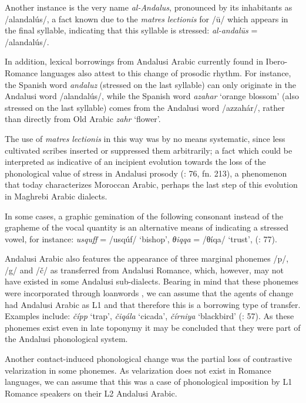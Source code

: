 \documentclass[output=paper,modfonts,nonflat]{langsci/langscibook}
\begin{document}
Another instance is the very name \textit{al-Andalus}, pronounced by its inhabitants as /alandalús/, a fact known due to the \textit{matres} \textit{lectionis} for /ū/ which appears in the final syllable, indicating that this syllable is stressed: {} \textit{al-andalūs} = /alandalús/.

In addition, lexical borrowings from Andalusi Arabic currently found in Ibero-Romance languages also attest to this change of prosodic rhythm. For instance, the Spanish word \textit{andaluz} (stressed on the last syllable) can only originate in the Andalusi word /alandalús/, while the Spanish word \textit{azahar} ‘orange blossom’ (also stressed on the last syllable) comes from the Andalusi word /azzahár/, rather than directly from Old Arabic \textit{zahr} ‘flower’.

The use of \textit{matres} \textit{lectionis} in this way was by no means systematic, since {less cultivated scribes inserted or suppressed them arbitrarily}; a fact which could be interpreted as indicative of an incipient evolution towards the loss of the phonological value of stress in Andalusi prosody (\citealt{CorrientePereiraVicente2015}: 76, fn. 213), a phenomenon that today characterizes Moroccan Arabic, perhaps the last step of this evolution in Maghrebi Arabic dialects.

{In some cases, a graphic gemination of the following consonant instead of the grapheme of the vocal quantity is an alternative means of indicating a stressed vowel, for instance: {} \textit{usquff} = /usqúf/ ‘bishop’, {} \textit{θiqqa} = /θíqa/ ‘trust’,} {(\citealt{CorrientePereiraVicente2015}: 77)}{.} 

Andalusi Arabic also features the appearance of three marginal phonemes /p/, /g/ and /č/ as transferred from Andalusi Romance, which, however, may not have existed in some Andalusi sub-dialects. Bearing in mind that these phonemes were incorporated through loanwords \citep{Corriente1978}, we can assume that the agents of change had Andalusi Arabic as L1 and that therefore this is a borrowing type of transfer. Examples include: \textit{čípp} ‘trap’, \textit{čiqála} ‘cicada’, \textit{čírniya} ‘blackbird’ (\citealt{CorrientePereiraVicente2015}: 57). As these phonemes exist even in late toponymy it may be concluded that they were part of the Andalusi phonological system. 

Another contact-induced phonological change was the partial loss of contrastive velarization in some phonemes. As velarization does not exist in Romance languages, we can assume that this was a case of phonological imposition by L1 Romance speakers on their L2 Andalusi Arabic. 
\end{document}

